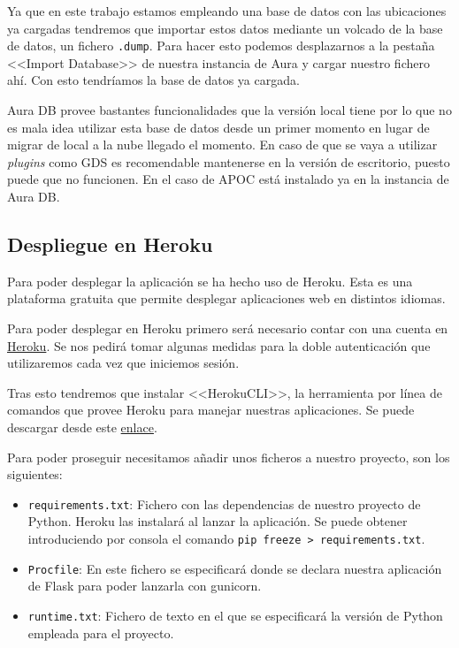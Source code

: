 
Ya que en este trabajo estamos empleando una base de datos con las ubicaciones ya cargadas tendremos que importar estos datos mediante un volcado de la base de datos, un fichero \texttt{.dump}. Para hacer esto podemos desplazarnos a la pestaña <<Import Database>> de nuestra instancia de Aura y cargar nuestro fichero ahí. Con esto tendríamos la base de datos ya cargada.


Aura DB provee bastantes funcionalidades que la versión local tiene por lo que no es mala idea utilizar esta base de datos desde un primer momento en lugar de migrar de local a la nube llegado el momento. En caso de que se vaya a utilizar \textit{plugins} como GDS es recomendable mantenerse en la versión de escritorio, puesto puede que no funcionen. En el caso de APOC está instalado ya en la instancia de Aura DB.

\subsection{Despliegue en Heroku}

Para poder desplegar la aplicación se ha hecho uso de Heroku. Esta es una plataforma gratuita que permite desplegar aplicaciones web en distintos idiomas.

Para poder desplegar en Heroku primero será necesario contar con una cuenta en \href{https://signup.heroku.com/}{Heroku}. Se nos pedirá tomar algunas medidas para la doble autenticación que utilizaremos cada vez que iniciemos sesión.

Tras esto tendremos que instalar <<HerokuCLI>>, la herramienta por línea de comandos que provee Heroku para manejar nuestras aplicaciones. Se puede descargar desde este \href{https://devcenter.heroku.com/articles/heroku-cli#install-the-heroku-cli}{enlace}.

Para poder proseguir necesitamos añadir unos ficheros a nuestro proyecto, son los siguientes:
\begin{itemize}
	\item \texttt{requirements.txt}: Fichero con las dependencias de nuestro proyecto de Python. Heroku las instalará al lanzar la aplicación. Se puede obtener introduciendo por consola el comando \texttt{pip freeze > requirements.txt}.
	\item \texttt{Procfile}: En este fichero se especificará donde se declara nuestra aplicación de Flask para poder lanzarla con gunicorn.
	\item \texttt{runtime.txt}: Fichero de texto en el que se especificará la versión de Python empleada para el proyecto.
\end{itemize}

